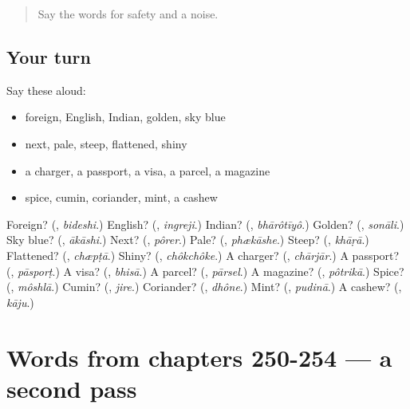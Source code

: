 \label{lesson:BN-R254-first-pass-words-from-chapters-246-249}



\begin{quote}
Say the words for safety and a noise.
\end{quote}

\subsection*{Your turn}
Say these aloud:

\begin{itemize}
\raggedright
  \item foreign, English, Indian, golden, sky blue
  \item next, pale, steep, flattened, shiny
  \item a charger, a passport, a visa, a parcel, a magazine
  \item spice, cumin, coriander, mint, a cashew
\end{itemize}

\begin{tcolorbox}[breakable,colback=teal!4,colframe=teal!35!black,title={Before you move on}]
Foreign? (\textbf{}, \emph{bideshi}.) English? (\textbf{}, \emph{ingreji}.) Indian? (\textbf{}, \emph{bhārôtīyô}.) Golden? (\textbf{}, \emph{sonāli}.) Sky blue? (\textbf{}, \emph{ākāshi}.) Next? (\textbf{}, \emph{pôrer}.) Pale? (\textbf{}, \emph{phækāshe}.) Steep? (\textbf{}, \emph{khāṛā}.) Flattened? (\textbf{}, \emph{chæpṭā}.) Shiny? (\textbf{}, \emph{chôkchôke}.) A charger? (\textbf{}, \emph{chārjār}.) A passport? (\textbf{}, \emph{pāsporṭ}.) A visa? (\textbf{}, \emph{bhisā}.) A parcel? (\textbf{}, \emph{pārsel}.) A magazine? (\textbf{}, \emph{pôtrikā}.) Spice? (\textbf{}, \emph{môshlā}.) Cumin? (\textbf{}, \emph{jire}.) Coriander? (\textbf{}, \emph{dhône}.) Mint? (\textbf{}, \emph{pudinā}.) A cashew? (\textbf{}, \emph{kāju}.)
\end{tcolorbox}
\section[(dialogue)]{Words from chapters 250-254 — a second pass}

\label{lesson:BN-R254-second-pass-words-from-chapters-250-254}



